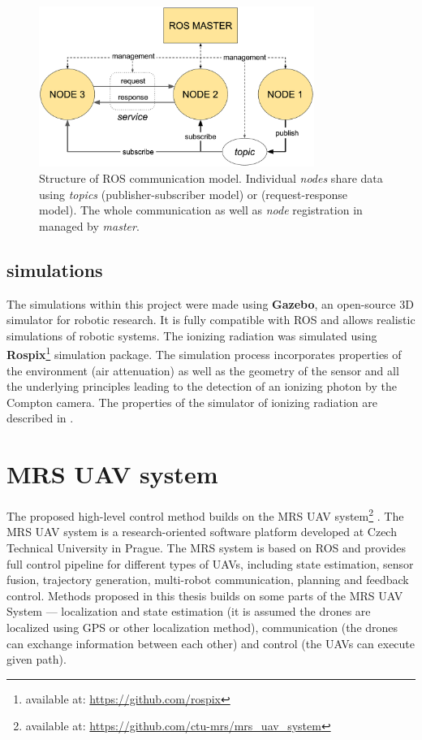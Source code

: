 \begin{figure}[!h]
    \centering
  \includegraphics[width=0.8\textwidth]{./fig/photos/ros_schema.eps}
    \caption{Structure of \ac{ROS} communication model. Individual \textit{nodes} share data using \textit{topics} (publisher-subscriber model) or  (request-response model). The whole communication as well as \textit{node} registration in managed by \textit{master}.}%
\end{figure}

\subsection{simulations}
The simulations within this project were made using \textbf{Gazebo}, an open-source 3D simulator for robotic research.
It is fully compatible with \ac{ROS} and allows realistic simulations of robotic systems.
The ionizing radiation was simulated using \textbf{Rospix}\footnote{available at: \url{https://github.com/rospix}} simulation package.
The simulation process incorporates properties of the environment (air attenuation) as well as the geometry of the sensor and all the underlying principles leading to the detection of an ionizing photon by the Compton camera.
The properties of the simulator of ionizing radiation are described in \cite{baca2019timepix}.

\section{MRS UAV system}
The proposed high-level control method builds on the MRS UAV system\footnote{available at: \url{https://github.com/ctu-mrs/mrs_uav_system}} \cite{mrs_system}.
The MRS UAV system is a research-oriented software platform developed at Czech Technical University in Prague.
The MRS system is based on \ac{ROS} and provides full control pipeline for different types of \ac{UAV}s, including state estimation, sensor fusion, trajectory generation, multi-robot communication, planning and feedback control.
Methods proposed in this thesis builds on some parts of the MRS UAV System --- localization and state estimation (it is assumed the drones are localized using \ac{GPS} or other localization method), communication (the drones can exchange information between each other) and control (the \ac{UAV}s can execute given path).


